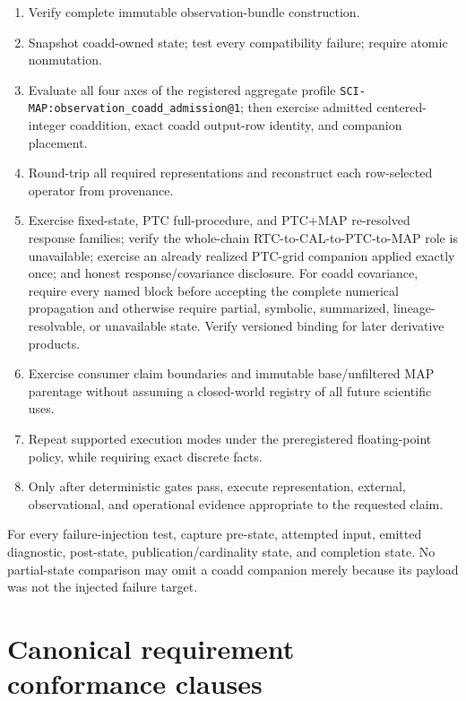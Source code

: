 \documentclass[10pt]{article}
\newcommand{\code}[1]{\nolinkurl{#1}}
\begin{document}
\begin{enumerate}
ALIGN-grid parent in the target WCS, one own-coordinate placement, separate
influence edges, and no precision or temporal-support promotion.
\item Verify complete immutable observation-bundle construction.
\item Snapshot coadd-owned state; test every compatibility failure; require
atomic nonmutation.
\item Evaluate all four axes of the registered aggregate profile
\code{SCI-MAP:observation_coadd_admission@1}; then exercise admitted
centered-integer coaddition, exact coadd output-row identity, and companion
placement.
\item Round-trip all required representations and reconstruct each
row-selected operator from provenance.
\item Exercise fixed-state, PTC full-procedure, and PTC+MAP re-resolved
response families; verify the whole-chain RTC-to-CAL-to-PTC-to-MAP role is
unavailable; exercise an already realized PTC-grid companion applied exactly
once; and honest response/covariance disclosure. For coadd covariance, require
every named block before accepting the complete numerical propagation and
otherwise require partial, symbolic, summarized, lineage-resolvable, or
unavailable state. Verify versioned binding for later derivative products.
\item Exercise consumer claim boundaries and immutable base/unfiltered MAP parentage without
assuming a closed-world registry of all future scientific uses.
\item Repeat supported execution modes under the preregistered floating-point
policy, while requiring exact discrete facts.
\item Only after deterministic gates pass, execute representation, external,
observational, and operational evidence appropriate to the requested claim.
\end{enumerate}

For every failure-injection test, capture pre-state, attempted input, emitted
diagnostic, post-state, publication/cardinality state, and completion state.
No partial-state comparison may omit a coadd companion merely because its
payload was not the injected failure target.

\clearpage
\section{Canonical requirement conformance clauses}\label{sec:requirements}
\end{document}
